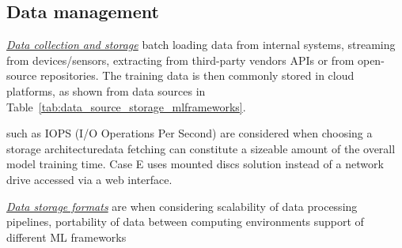 


\subsection{Data management}

\underline{\emph{Data collection and storage}}
\DIFdelbegin {}\DIFdelend \DIFaddbegin {}\DIFaddend batch loading data from internal systems, streaming from devices/sensors, extracting from  \DIFdelbegin {}\DIFdelend third-party vendors \DIFdelbegin {}\DIFdelend APIs or from open-source repositories. The training data is then commonly stored in cloud platforms, as shown from data sources in Table~\ref{tab:data_source_storage_mlframeworks}.

\DIFdelbegin {}\DIFdelend 


\DIFdelbegin {}\DIFdelend \DIFaddbegin {}\DIFaddend such as IOPS (I/O Operations Per Second) \DIFdelbegin \DIFdel{, }\DIFdelend are considered when choosing a storage architecture\DIFdelbegin {}\DIFdelend \DIFaddbegin \DIFadd{; }\DIFaddend data fetching can constitute a sizeable amount of the overall model training time.  Case E uses mounted discs solution instead of a network drive accessed via a web interface. %

\underline{\emph{Data storage formats}} are \DIFdelbegin {}\DIFdelend \DIFaddbegin {}\DIFaddend when considering scalability of data processing pipelines, portability of data between computing environments \DIFdelbegin \DIFdel{, }\DIFdelend \DIFaddbegin {}\DIFaddend support of different ML frameworks\DIFdelbegin {}%

